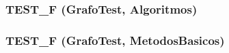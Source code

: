 \subsubsection{\setlength{\rightskip}{0pt plus 5cm}TEST\_\-F ({\bf GrafoTest}, Algoritmos)}\label{testgrafo_8cpp_2b4d02c01aa42eefe54139d9dcfbd960}


\subsubsection{\setlength{\rightskip}{0pt plus 5cm}TEST\_\-F ({\bf GrafoTest}, MetodosBasicos)}\label{testgrafo_8cpp_1868b06496e0b6e802e92c94816a3c0d}


